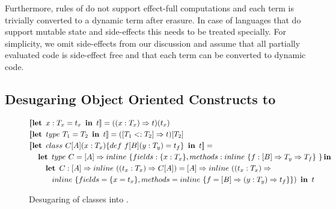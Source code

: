 Furthermore, rules of \calculus do not support effect-full computations and each
  term is trivially converted to a dynamic term after erasure.
 In case of languages that do support mutable state and side-effects this needs to
 be treated specially. For simplicity, we omit side-effects from our discussion and
 assume that all partially evaluated code is side-effect free and that each
  term can be converted to dynamic code.

\subsection{Desugaring Object Oriented Constructs to \calculus}
\label{sct:desugaring}

\begin{figure*}
\begin{alignat*}{2}
   & [\![ \klet\ x: T_x = t_x\ \kin \ t ]\!] = ((x: T_x) \ra t)(t_x)\\
   & [\![ \klet\ type\ T_1 = T_2\ \kin\ t ]\!] =  ([T_1 <: T_2] \ra t)[T_2] \\
   & [\![ \klet\ class\ C[A](x: T_x) \{ def\ f[B](y: T_y) = t_f \}\ \kin\ t ]\!]  =  \\
   & \quad   \klet\ type\  C = [A] \ra \inline \{ fields: \{ x: T_x \}, methods: \inline \{ f: [B] \ra T_y \ra T_f \}\ \} \kin  \\
   & \quad \quad \klet\ C: [A] \ra \inline((t_x: T_x) \ra C[A])  =  [A] \ra \inline((t_x: T_x) \ra\\
   & \quad \quad \quad  \inline \{ fields = \{x = t_x\}, methods = \inline \{f = [B] \ra (y: T_y) \ra t_f \}\}) \ \kin\ t
\end{alignat*}
\caption{Desugaring of classes into \calculus.}
\label{fig:desugaring-classes}
\end{figure*}


